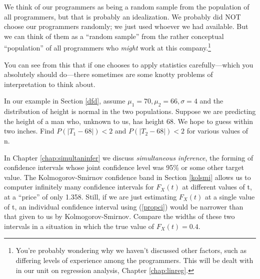 We think of our programmers as being a random sample from the population
of all programmers, but that is probably an idealization.  We probably
did NOT choose our programmers randomly; we just used whoever we had
available.  But we can think of them as a ``random sample'' from the
rather conceptual ``population'' of all programmers who {\it might} work
at this company.\footnote{You're probably wondering why we haven't
discussed other factors, such as differing levels of experience among
the programmers.  This will be dealt with in our unit on regression
analysis, Chapter \ref{chap:linreg}.}


You can see from this that if one chooses to apply statistics
carefully---which you absolutely should do---there sometimes are some
knotty problems of interpretation to think about.


\startproblemset

\oneproblem
In our example in Section \ref{dfd}, assume $\mu_1 = 70, \mu_2= 66,
\sigma = 4$ and the distribution of height is normal in the two
populations.  Suppose we are predicting the height of a man who, unknown
to us, has height 68.  We hope to guess within two inches.  Find $P(|T_1
- 68|) < 2$ and $P(|T_2 - 68|) < 2$ for various values of n.

\oneproblem
In Chapter \ref{chap:simultaninfer} we discuss {\it simultaneous inference},
the forming of confidence intervals whose joint confidence level was
95\% or some other target value.  The Kolmogorov-Smirnov confidence band
in Section \ref{kolsmi} allows us to computer infinitely many confidence
intervals for $F_X(t)$ at different values of t, at a ``price'' of only
1.358.  Still, if we are just estimating $F_X(t)$ at a single value of
t, an individual confidence interval using (\ref{propci}) would be
narrower than that given to us by Kolmogorov-Smirnov.  Compare the
widths of these two intervals in a situation in which the true value of
$F_X(t) = 0.4$.

